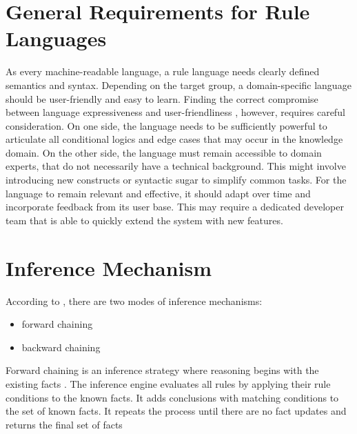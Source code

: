 \section{General Requirements for Rule Languages}\label{sec:general-rule-language-requirements}
As every machine-readable language, a rule language needs clearly defined semantics and syntax.
Depending on the target group, a domain-specific language should be user-friendly and easy to learn.
Finding the correct compromise between language expressiveness and user-friendliness \cite{https://doi.org/10.1002/widm.11},
however, requires careful consideration.
On one side, the language needs
to be sufficiently powerful to articulate all conditional logics and edge cases that may occur in the knowledge domain.
On the other side, the language must remain accessible to domain experts, that do not necessarily have a technical background.
This might involve introducing new constructs or syntactic sugar to simplify common tasks.
For the language to remain relevant and effective, it should adapt over time and incorporate feedback from its user base.
This may require a dedicated developer team that is able to quickly extend the system with new features.

%

\section{Inference Mechanism}\label{sec:inference-mechanism}

According to \cite{https://doi.org/10.1002/widm.11}, there are two modes of inference mechanisms:

\begin{itemize}
    \item forward chaining
    \item backward chaining
\end{itemize}

Forward chaining is an inference strategy where reasoning begins with the existing facts \cite{al2015comparison}.
The inference engine evaluates all rules by applying their rule conditions to the known facts.
It adds conclusions with matching conditions to the set of known facts.
It repeats the process until there are no fact updates and returns the final set of facts

